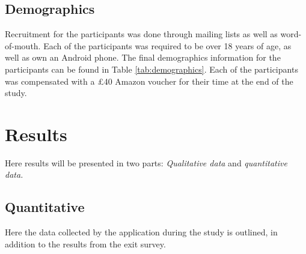\documentclass{l4proj}
\begin{document}
\subsection{Demographics}

Recruitment for the participants was done through mailing lists as well as word-of-mouth. Each of the participants was required to be over 18 years of age, as well as own an Android phone. The final demographics information for the participants can be found in Table \ref{tab:demographics}. Each of the participants was compensated with a £40 Amazon voucher for their time at the end of the study.

\begin{table}[]


\caption{Demographics information for the participants collected in the initial meeting during the study.}
\label{tab:demographics}
\end{table}
\newpage
\section{Results}

Here results will be presented in two parts: \textit{Qualitative data} and \textit{quantitative data.}

\subsection{Quantitative}
Here the data collected by the application during the study is outlined, in addition to the results from the exit survey.
\end{document}
